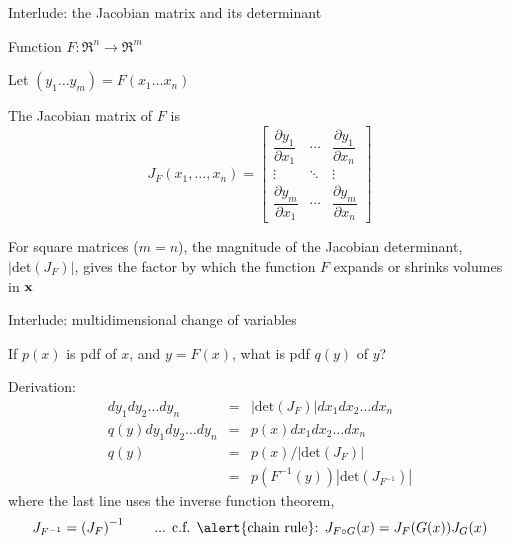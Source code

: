 \documentclass{beamer}
\begin{document}
\begin{frame}{Interlude: the Jacobian matrix and its determinant}

\itemb
\item Function $F:\Re^n \to \Re^m$
\item Let $(y_1 \ldots y_m) = F(x_1 \ldots x_n)$
\item The \alert{Jacobian matrix} of $F$ is
\[
J_F(x_1,\ldots,x_n) =
\begin{bmatrix} \dfrac{\partial y_1}{\partial x_1} & \cdots & \dfrac{\partial y_1}{\partial x_n} \\ \vdots & \ddots & \vdots \\ \dfrac{\partial y_m}{\partial x_1} & \cdots & \dfrac{\partial y_m}{\partial x_n}  \end{bmatrix}
\]
\item For square matrices ($m=n$), the magnitude of the \alert{Jacobian determinant}, $|\mbox{det}(J_F)|$, gives the factor by which the function $F$ expands or shrinks volumes in ${\bf x}$
\iteme

\end{frame}

\begin{frame}{Interlude: multidimensional change of variables}

\itemb
 \item If $p(x)$ is pdf of $x$, and $y=F(x)$, what is pdf $q(y)$ of $y$?
 \item Derivation:
\begin{eqnarray*}
dy_1 dy_2 \ldots dy_n & = & \left|\mbox{det}\left(J_F\right)\right| dx_1 dx_2 \ldots dx_n \\
q(y) dy_1 dy_2 \ldots dy_n & = & p(x) dx_1 dx_2 \ldots dx_n \\
q(y) & = & p(x) / \left|\mbox{det}\left(J_F\right)\right| \\
& = & p(F^{-1}(y)) \left|\mbox{det}\left(J_{F^{-1}}\right)\right|
\end{eqnarray*}
where the last line uses the \alert{inverse function theorem},
\[
J_{F^{-1}} = \left( J_F \right)^{-1}
 \quad \quad \mbox{... c.f. \alert{chain rule}: $J_{F \circ G}(x) = J_F(G(x)) J_G(x)$}
\]
\iteme

\end{frame}
\end{document}

